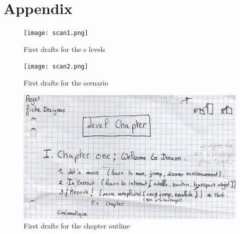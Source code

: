 \chapter*{Appendix}
	\begin{figure}
		\texttt{[image: scan1.png]}
		\caption{First drafts for the s levels}
	\end{figure}
	\begin{figure}
		\texttt{[image: scan2.png]}
		\caption{First drafts for the scenario}
	\end{figure}
	\begin{figure}
		\includegraphics{scan3.png}
		\caption{First drafts for the chapter outline}
	\end{figure}